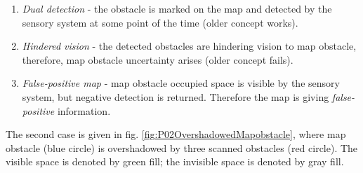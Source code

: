 \begin{enumerate}
    \item \emph{Dual detection} - the obstacle is marked on the map and detected by the sensory system at some point of the time (older concept works).
    
    \item \emph{Hindered vision} - the detected obstacles are hindering vision to map obstacle, therefore, map obstacle uncertainty arises (older concept fails). 
    
    \item \emph{False-positive map} - map obstacle occupied space is visible by the sensory system, but negative detection is returned. Therefore the map is giving \emph{false-positive} information.
\end{enumerate}

\noindent The second case is given in fig. \ref{fig:P02OvershadowedMapobstacle}, where map obstacle (blue circle) is overshadowed by three scanned obstacles (red circle). The visible space is denoted by green fill; the invisible space is denoted by gray fill. 